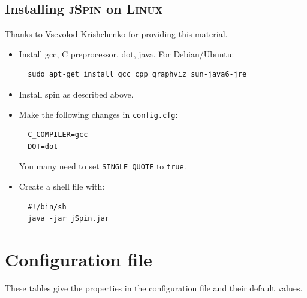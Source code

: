 \documentclass[11pt]{article}
\newcommand{\js}{\textsc{jSpin}}
\newcommand{\p}[1]{\texttt{#1}}
\begin{document}
\subsection{Installing \js{} on \textsc{Linux}}\label{a.linux}

Thanks to Vsevolod Krishchenko for providing this material.

\begin{itemize}

\item Install gcc, C preprocessor, dot, java. For Debian/Ubuntu:
\begin{verbatim}
  sudo apt-get install gcc cpp graphviz sun-java6-jre
\end{verbatim}
\item Install spin as described above.
\item Make the following changes in \p{config.cfg}:
\begin{verbatim}
  C_COMPILER=gcc
  DOT=dot
\end{verbatim}
You many need to set \p{SINGLE\_QUOTE} to \p{true}.
\item Create a shell file with:
\begin{verbatim}
  #!/bin/sh
  java -jar jSpin.jar
\end{verbatim}
\end{itemize}

\section{Configuration file}\label{a.cfg}

These tables give the properties in the configuration file and their
default values.
\end{document}
